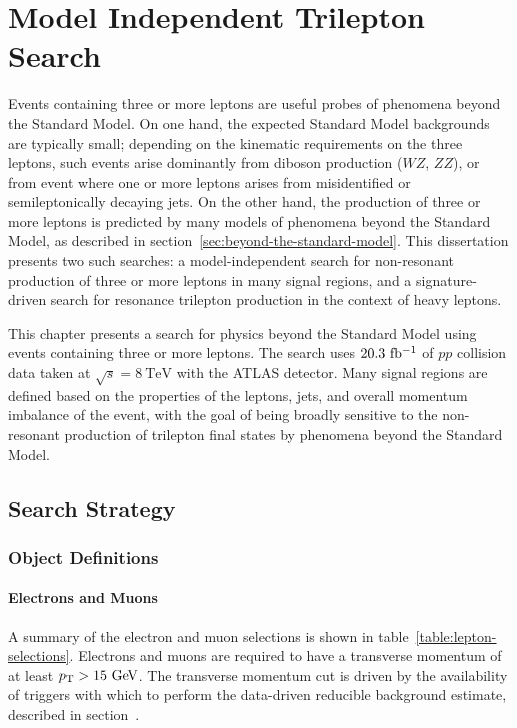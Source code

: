 \chapter{Model Independent Trilepton Search}\label{ch:model-independent-trilepton-search}

Events containing three or more leptons are useful probes of phenomena beyond the Standard Model. On one hand, the expected Standard Model backgrounds are typically small; depending on the kinematic requirements on the three leptons, such events arise dominantly from diboson production ($WZ$, $ZZ$), or from event where one or more leptons arises from misidentified or semileptonically decaying jets. On the other hand, the production of three or more leptons is predicted by many models of phenomena beyond the Standard Model, as described in section~\ref{sec:beyond-the-standard-model}. This dissertation presents two such searches: a model-independent search for non-resonant production of three or more leptons in many signal regions, and a signature-driven search for resonance trilepton production in the context of heavy leptons. 

This chapter presents a search for physics beyond the Standard Model using events containing three or more leptons. The search uses $20.3~\mbox{fb$^{-1}$}$ of $pp$ collision data taken at $\sqrt{s}=8~\mbox{TeV}$ with the ATLAS detector. Many signal regions are defined based on the properties of the leptons, jets, and overall momentum imbalance of the event, with the goal of being broadly sensitive to the non-resonant production of trilepton final states by phenomena beyond the Standard Model. 

\section{Search Strategy}

\subsection{Object Definitions}\label{sec:object-definitions}

\subsubsection{Electrons and Muons}

A summary of the electron and muon selections is shown in table~\ref{table:lepton-selections}. Electrons and muons are required to have a transverse momentum of at least $\pt>15 \GeV$. The transverse momentum cut is driven by the availability of triggers with which to perform the data-driven reducible background estimate, described in section~\label{sec:fake-factors}. 

